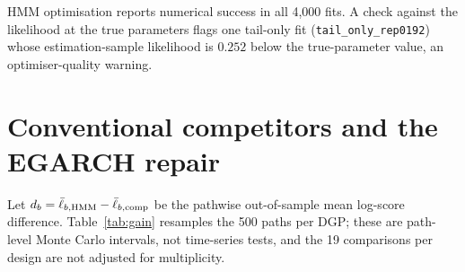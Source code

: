 \documentclass[11pt,a4paper]{article}
\theoremstyle{plain}
\theoremstyle{remark}
\begin{document}
HMM optimisation reports numerical success in all 4{,}000 fits. A check against the likelihood at the true parameters flags one tail-only fit (\texttt{tail\_only\_rep0192}) whose estimation-sample likelihood is $0.252$ below the true-parameter value, an optimiser-quality warning.

\section{Conventional competitors and the EGARCH repair}\label{sec:comp}
Let $d_b=\bar\ell_{b,\rm HMM}-\bar\ell_{b,\rm comp}$ be the pathwise out-of-sample mean log-score difference. Table~\ref{tab:gain} resamples the 500 paths per DGP; these are path-level Monte Carlo intervals, not time-series tests, and the 19 comparisons per design are not adjusted for multiplicity.
\end{document}
